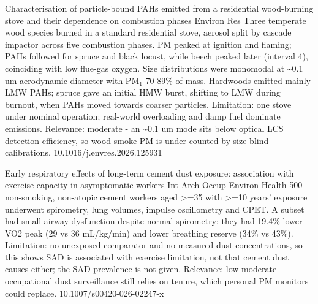 \documentclass[10pt]{article}
\begin{document}
\par{}\baselineskip{}\baselineskip
{}

{Characterisation of particle-bound PAHs emitted from a residential wood-burning stove and their dependence on combustion phases}
{Environ Res}
{Three temperate wood species burned in a standard residential stove, aerosol split by cascade impactor across five combustion phases. PM peaked at ignition and flaming; PAHs followed for spruce and black locust, while beech peaked later (interval 4), coinciding with low flue-gas oxygen. Size distributions were monomodal at \textasciitilde{}0.1 um aerodynamic diameter with PM$_{1}$ 70-89\% of mass. Hardwoods emitted mainly LMW PAHs; spruce gave an initial HMW burst, shifting to LMW during burnout, when PAHs moved towards coarser particles. Limitation: one stove under nominal operation; real-world overloading and damp fuel dominate emissions. Relevance: moderate - an \textasciitilde{}0.1 um mode sits below optical LCS detection efficiency, so wood-smoke PM is under-counted by size-blind calibrations.}
{10.1016/j.envres.2026.125931}

{Early respiratory effects of long-term cement dust exposure: association with exercise capacity in asymptomatic workers}
{Int Arch Occup Environ Health}
{500 non-smoking, non-atopic cement workers aged >=35 with >=10 years' exposure underwent spirometry, lung volumes, impulse oscillometry and CPET. A subset had small airway dysfunction despite normal spirometry; they had 19.4\% lower VO2 peak (29 vs 36 mL/kg/min) and lower breathing reserve (34\% vs 43\%). Limitation: no unexposed comparator and no measured dust concentrations, so this shows SAD is associated with exercise limitation, not that cement dust causes either; the SAD prevalence is not given. Relevance: low-moderate - occupational dust surveillance still relies on tenure, which personal PM monitors could replace.}
{10.1007/s00420-026-02247-x}

\par{}\baselineskip{}\baselineskip
{}
\end{document}
